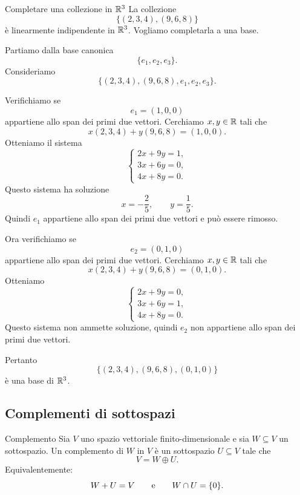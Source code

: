 \documentclass[a4paper]{article}
\begin{document}
\begin{snippetexample}{Completare una collezione in \(\mathbb{R}^3\)}
    La collezione
    \[
        \{(2,3,4),(9,6,8)\}
    \]
    è linearmente indipendente in \(\mathbb{R}^3\). Vogliamo completarla a una base.

    Partiamo dalla base canonica
    \[
        \{e_1,e_2,e_3\}.
    \]
    Consideriamo
    \[
        \{(2,3,4),(9,6,8),e_1,e_2,e_3\}.
    \]

    Verifichiamo se
    \[
        e_1=(1,0,0)
    \]
    appartiene allo span dei primi due vettori. Cerchiamo \(x,y\in\mathbb{R}\) tali che
    \[
        x(2,3,4)+y(9,6,8)=(1,0,0).
    \]
    Otteniamo il sistema
    \[
        \begin{cases}
            2x+9y=1,\\
            3x+6y=0,\\
            4x+8y=0.
        \end{cases}
    \]
    Questo sistema ha soluzione
    \[
        x=-\frac{2}{5},
        \qquad
        y=\frac{1}{5}.
    \]
    Quindi \(e_1\) appartiene allo span dei primi due vettori e può essere rimosso.

    Ora verifichiamo se
    \[
        e_2=(0,1,0)
    \]
    appartiene allo span dei primi due vettori. Cerchiamo \(x,y\in\mathbb{R}\) tali che
    \[
        x(2,3,4)+y(9,6,8)=(0,1,0).
    \]
    Otteniamo
    \[
        \begin{cases}
            2x+9y=0,\\
            3x+6y=1,\\
            4x+8y=0.
        \end{cases}
    \]
    Questo sistema non ammette soluzione, quindi \(e_2\) non appartiene allo span dei primi due vettori.

    Pertanto
    \[
        \{(2,3,4),(9,6,8),(0,1,0)\}
    \]
    è una base di \(\mathbb{R}^3\).
\end{snippetexample}

\subsection{Complementi di sottospazi}

\begin{snippetdefinition}{Complemento}
    Sia \(V\) uno spazio vettoriale finito-dimensionale e sia \(W\subseteq V\) un sottospazio. Un complemento di \(W\) in \(V\) è un sottospazio \(U\subseteq V\) tale che
    \[
        V=W\oplus U.
    \]
    Equivalentemente:
    \[
        W+U=V
        \qquad
        \text{e}
        \qquad
        W\cap U=\{0\}.
    \]
\end{snippetdefinition}
\end{document}
